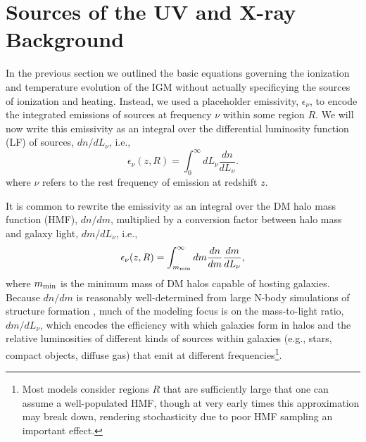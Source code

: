 %
%

\section{Sources of the UV and X-ray Background} \label{sec:sources}
In the previous section we outlined the basic equations governing the ionization and temperature evolution of the IGM without actually specificying the sources of ionization and heating. Instead, we used a placeholder emissivity, $\epsilon_{\nu}$, to encode the integrated emissions of sources at frequency $\nu$ within some region $R$. We will now write this emissivity as an integral over the differential luminosity function (LF) of sources, $dn/dL_{\nu}$, i.e.,
\begin{equation}
	\epsilon_{\nu}(z,R) = \int_0^{\infty} dL_{\nu} \frac{dn}{dL_{\nu}} .
\end{equation}
where $\nu$ refers to the rest frequency of emission at redshift $z$. 

It is common to rewrite the emissivity as an integral over the DM halo mass function (HMF), $dn/dm$, multiplied by a conversion factor between halo mass and galaxy light, $dm/dL_{\nu}$, i.e.,
\begin{equation}
	\epsilon_{\nu}(z,R) = \int_{m_{\text{min}}}^{\infty} dm \frac{dn}{dm} \frac{dm}{d L_{\nu}} ,
\end{equation}
where $m_{\text{min}}$ is the minimum mass of DM halos capable of hosting galaxies. Because $dn/dm$ is reasonably well-determined from large N-body simulations of structure formation \cite{PS1974,SMT2001,Tinker2010}, much of the modeling focus is on the mass-to-light ratio, $dm/dL_{\nu}$, which encodes the efficiency with which galaxies form in halos and the relative luminosities of different kinds of sources within galaxies (e.g., stars, compact objects, diffuse gas) that emit at different frequencies\footnote{Most models consider regions $R$ that are sufficiently large that one can assume a well-populated HMF, though at very early times this approximation may break down, rendering stochasticity due to poor HMF sampling an important effect.}. 


